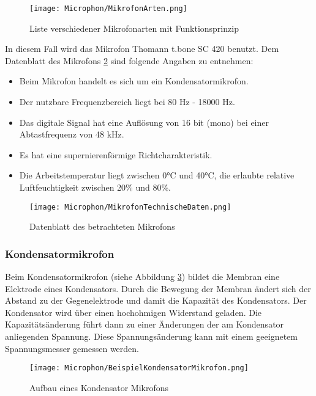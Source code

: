 \begin{figure}[ht]
    \centering
    \texttt{[image: Microphon/MikrofonArten.png]}
    \caption{Liste verschiedener Mikrofonarten mit Funktionsprinzip}
    \label{fig:Mikrofonarten}
\end{figure}

In diesem Fall wird das Mikrofon Thomann t.bone SC 420 benutzt. 
Dem Datenblatt des Mikrofons \ref{fig:Datenblatt Mikrofon} sind folgende Angaben zu entnehmen:

\begin{itemize}
  \item Beim Mikrofon handelt es sich um ein Kondensatormikrofon. 
  \item Der nutzbare Frequenzbereich liegt bei 80 Hz - 18000 Hz. 
  \item Das digitale Signal hat eine Auflösung von 16 bit (mono) bei einer Abtastfrequenz von 48 kHz.
  \item Es hat eine supernierenförmige Richtcharakteristik.
  \item Die Arbeitstemperatur liegt zwischen 0°C und 40°C, die erlaubte relative Luftfeuchtigkeit zwischen 20\% und 80\%.
\end{itemize}

\begin{figure}[ht]
    \centering
    \texttt{[image: Microphon/MikrofonTechnischeDaten.png]}
    \caption{Datenblatt des betrachteten Mikrofons}
    \label{fig:Datenblatt Mikrofon}
\end{figure}

\subsubsection{Kondensatormikrofon}

Beim Kondensatormikrofon (siehe Abbildung \ref{fig:Kondensator Mikrofon}) bildet die Membran eine Elektrode eines Kondensators. Durch die Bewegung der Membran 
ändert sich der Abstand zu der Gegenelektrode und damit die Kapazität des Kondensators.
Der Kondensator wird über einen hochohmigen Widerstand geladen. Die Kapazitätsänderung führt dann zu einer
Änderungen der am Kondensator anliegenden Spannung. Diese Spannungsänderung kann mit einem geeignetem Spannungsmesser gemessen werden. 

\begin{figure}[ht]
    \centering
    \texttt{[image: Microphon/BeispielKondensatorMikrofon.png]}
    \caption{Aufbau eines Kondensator Mikrofons}
    \label{fig:Kondensator Mikrofon}
\end{figure}


